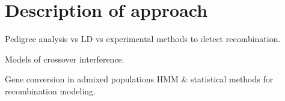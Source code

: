 \section{Description of approach}
\begin{titemize}
    \item Pedigree analysis vs LD vs experimental methods to detect recombination.
    \item Models of crossover interference.
    \item Gene conversion in admixed populations HMM \& statistical methods for recombination modeling.
\end{titemize}


